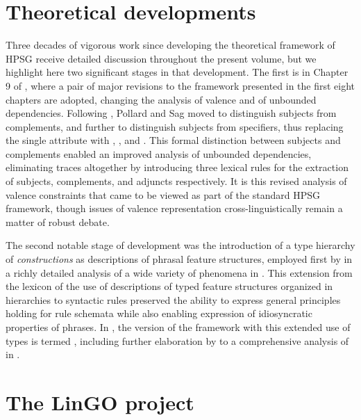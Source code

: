 \documentclass[output=paper
 	        ,biblatex
                ,babelshorthands
                ,newtxmath
                ,draftmode
                ,colorlinks, citecolor=brown
]{langscibook}
\begin{document}
\section{Theoretical developments}
\label{evolution:sec-theoretical-developments}

Three decades of vigorous work since \cite{ps} developing the theoretical framework of HPSG receive detailed discussion throughout the present volume, but we highlight here two significant stages in that development.  The first is in Chapter 9 of , where a pair of major revisions to the framework presented in the first eight chapters are adopted, changing the analysis of valence and of unbounded dependencies.  Following \citet{Borsley87a,Borsley88b-u,Borsley89,Borsley90a}, Pollard and Sag moved to distinguish subjects from complements, and further to distinguish subjects from specifiers, thus replacing the single \subcat attribute with \subj, \spr, and \comps.  This formal distinction between subjects and complements enabled an improved analysis of unbounded dependencies, eliminating traces altogether by introducing three lexical rules for the extraction of subjects, complements, and adjuncts respectively.   It is this revised analysis of valence constraints that came to be viewed as part of the standard HPSG framework, though issues of valence representation cross-linguistically remain a matter of robust debate.

The second notable stage of development was the introduction of a type hierarchy of \emph{constructions} as descriptions of phrasal feature structures, employed first by \citet{Sag97a} in a richly detailed analysis of a wide variety of  phenomena in .  This extension from the lexicon of the use of descriptions of typed feature structures organized in hierarchies to syntactic rules preserved the ability to express general principles holding for rule schemata while also enabling expression of idiosyncratic properties of phrases.  In , the version of the framework with this extended use of types is termed , including further elaboration by \citet{GSag2000a-u} to a comprehensive analysis of  in .  

\section{The LinGO project}
\end{document}
